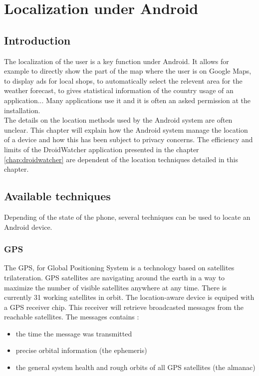 \chapter{Localization under Android}

\section*{Introduction}
The localization of the user is a key function under Android.
It allows for example to directly show the part of the map where the user is on Google Maps, to display ads for local shops, to automatically select the relevent area for the weather forecast, to gives statistical information of the country usage of an application...
Many applications use it and it is often an asked permission at the installation.\\

The details on the location methods used by the Android system are often unclear.
This chapter will explain how the Android system manage the location of a device and how this has been subject to privacy concerns.
The efficiency and limits of the DroidWatcher application presented in the chapter \ref{chap:droidwatcher} are dependent of the location techniques detailed in this chapter.

\section{Available techniques}
Depending of the state of the phone, several techniques can be used to locate an Android device.

\subsection{GPS}
The GPS, for Global Positioning System is a technology based on satellites trilateration\cite{pocketgpsworld}.
GPS satellites are navigating around the earth in a way to maximize the number of visible satellites anywhere at any time.
There is currently 31 working satellites in orbit.
The location-aware device is equiped with a GPS receiver chip.
This receiver will retrieve broadcasted messages from the reachable satellites.
The messages contains :

\begin{itemize}
\item the time the message was transmitted
\item precise orbital information (the ephemeris)
\item the general system health and rough orbits of all GPS satellites (the almanac)
\end{itemize}

